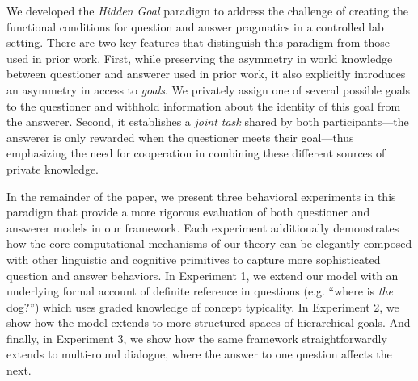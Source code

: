 \documentclass[12pt, floatsintext, jou]{apa6}
\begin{document}
We developed the \emph{Hidden Goal} paradigm to address the challenge of creating the functional conditions for question and answer pragmatics in a controlled lab setting.
There are two key features that distinguish this paradigm from those used in prior work.
First, while preserving the asymmetry in world knowledge between questioner and answerer used in prior work, it also explicitly introduces an asymmetry in access to \emph{goals}.
We privately assign one of several possible goals to the questioner and withhold information about the identity of this goal from the answerer. 
Second, it establishes a \emph{joint task} shared by both participants---the answerer is only rewarded when the questioner meets their goal---thus emphasizing the need for cooperation in combining these different sources of private knowledge. 



In the remainder of the paper, we present three behavioral experiments in this paradigm that provide a more rigorous evaluation of both questioner and answerer models in our framework.
Each experiment additionally demonstrates how the core computational mechanisms of our theory can be elegantly composed with other linguistic and cognitive primitives to capture more sophisticated question and answer behaviors.
In Experiment 1, we extend our model with an underlying formal account of definite reference in questions (e.g. ``where is \emph{the} dog?'') which uses graded knowledge of concept typicality.
In Experiment 2, we show how the model extends to more structured spaces of hierarchical goals.
And finally, in Experiment 3, we show how the same framework straightforwardly extends to multi-round dialogue, where the answer to one question affects the next.
\end{document}
